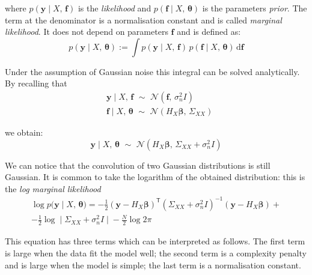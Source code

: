 \noindent
where $p(\mathbf{y}\;\vert\; X,\,\mathbf{f})$ is the \textit{likelihood} and $p(\mathbf{f}\;\vert\; X,\,\boldsymbol{\theta})$ is the parameters \textit{prior}. The term at the denominator is a normalisation constant and is called \textit{marginal likelihood}. It does not depend on parameters $\mathbf{f}$ and is defined as:
%
\begin{equation}\label{eq:paramsmarglike}
    p(\mathbf{y}\;\vert\; X,\,\boldsymbol{\theta}) := \int p(\mathbf{y}\;\vert\; X,\,\mathbf{f})\,p(\mathbf{f}\;\vert\; X,\,\boldsymbol{\theta})\,\text{d}\mathbf{f}
\end{equation}

\noindent
Under the assumption of Gaussian noise this integral can be solved analytically. By recalling that
%
\begin{align}
    &\mathbf{y}\;\vert\; X,\,\mathbf{f}\,\,\sim\,\,\mathcal{N}(\mathbf{f},\,\sigma_n^2I) \\
    &\mathbf{f}\;\vert\; X,\,\boldsymbol{\theta} \,\,\sim\,\,\mathcal{N}(H_{X}\boldsymbol{\beta},\,\Sigma_{XX})
\end{align}

\noindent
we obtain:
%
\begin{equation}
    \mathbf{y}\;\vert\; X,\,\boldsymbol{\theta}\,\,\sim\,\,\mathcal{N}(H_{X}\boldsymbol{\beta},\,\Sigma_{XX}+\sigma_n^2I)
\end{equation}

\noindent
We can notice that the convolution of two Gaussian distributions is still Gaussian. It is common to take the logarithm of the obtained distribution: this is the \textit{log marginal likelihood}
%
\begin{equation}\label{eq:logmarginallikelihood}
    \begin{split}
        \log{p(\mathbf{y}\;\vert\; X,\,\boldsymbol{\theta}}) = -\frac{1}{2}(\mathbf{y}-H_X\boldsymbol{\beta})^\mathsf{T}(\Sigma_{XX}+\sigma_n^2I)^{-1}(\mathbf{y}-H_X\boldsymbol{\beta}) + \\ -\frac{1}{2}\log{\;\vert\; \Sigma_{XX}+\sigma_n^2I\;\vert\; } - \frac{N}{2}\log{2\pi}
    \end{split}
\end{equation}

\noindent
This equation has three terms which can be interpreted as follows. The first term is large when the data fit the model well; the second term is a complexity penalty and is large when the model is simple; the last term is a normalisation constant.

